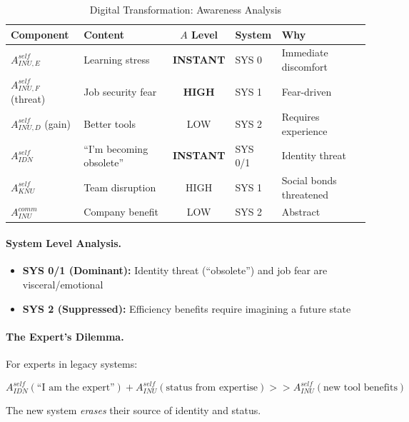 \begin{table}[htbp]
\centering
\caption{Digital Transformation: Awareness Analysis}
\label{tab:digital-awareness}
\renewcommand{\arraystretch}{1.3}
\begin{tabular}{@{}llcll@{}}
\toprule
\textbf{Component} & \textbf{Content} & \textbf{$A$ Level} & \textbf{System} & \textbf{Why} \\
\midrule
$A^{self}_{INU,E}$ & Learning stress & \textbf{INSTANT} & SYS 0 & Immediate discomfort \\
$A^{self}_{INU,F}$ (threat) & Job security fear & \textbf{HIGH} & SYS 1 & Fear-driven \\
$A^{self}_{INU,D}$ (gain) & Better tools & LOW & SYS 2 & Requires experience \\
$A^{self}_{IDN}$ & ``I'm becoming obsolete'' & \textbf{INSTANT} & SYS 0/1 & Identity threat \\
$A^{self}_{KNU}$ & Team disruption & HIGH & SYS 1 & Social bonds threatened \\
$A^{comm}_{INU}$ & Company benefit & LOW & SYS 2 & Abstract \\
\bottomrule
\end{tabular}
\end{table}

\paragraph{System Level Analysis.}
\begin{itemize}
\item \textbf{SYS 0/1 (Dominant):} Identity threat (``obsolete'') and job fear 
are visceral/emotional
\item \textbf{SYS 2 (Suppressed):} Efficiency benefits require imagining a 
future state
\end{itemize}

\paragraph{The Expert's Dilemma.}
For experts in legacy systems:

\begin{equation}
A^{self}_{IDN}(\text{``I am the expert''}) + A^{self}_{INU}(\text{status from expertise}) >> A^{self}_{INU}(\text{new tool benefits})
\end{equation}

The new system \emph{erases} their source of identity and status.

